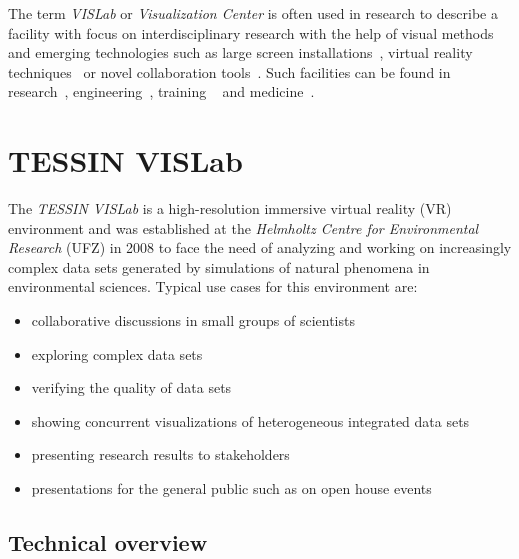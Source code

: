 \documentclass[twocolumn]{svjour3}          %
\begin{document}
The term \emph{VISLab} or \emph{Visualization Center} is often used in research to describe a facility with focus on interdisciplinary research with the help of visual methods and emerging technologies such as large screen installations~\cite{web:kaust}, virtual reality techniques~\cite{bryson:vr,burdea:vr} or novel collaboration tools~\cite{johnson:tele-immersivecollaboration}. Such facilities can be found in research~\cite{web:vr-science}, engineering~\cite{web:vr-engineering}, training ~\cite{seymour:vror} and medicine~\cite{web:vr-medicine}.

\section{TESSIN VISLab}
\label{tessin-vislab}

The \emph{TESSIN VISLab} is a high-resolution immersive virtual reality (VR) environment and was established at the \emph{Helmholtz Centre for Environmental Research} (UFZ) in 2008 to face the need of analyzing and working on increasingly complex data sets generated by simulations of natural phenomena in environmental sciences. Typical use cases for this environment are:

\begin{itemize}
\itemsep1pt\parskip0pt
\item
  collaborative discussions in small groups of scientists
\item
  exploring complex data sets
\item
  verifying the quality of data sets
\item
  showing concurrent visualizations of heterogeneous integrated data sets
\item
  presenting research results to stakeholders
\item
  presentations for the general public such as on open house events
\end{itemize}

\subsection{Technical overview}
\label{technical-overview}
\end{document}
